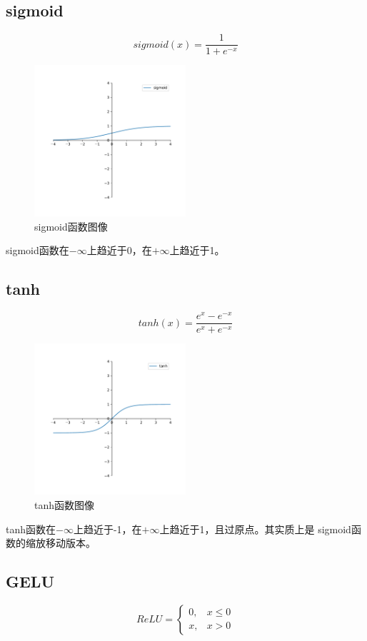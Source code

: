 \documentclass[AutoFakeBold]{LZUThesis}
\begin{document}
\subsection{sigmoid}
$$sigmoid(x)=\frac{1}{1+e^{-x}}$$
\begin{figure}[H]
	\centering
    \includegraphics[width=0.5\textwidth]{figures/sigmoid.pdf}
    \caption{sigmoid函数图像}
    \label{fig_sigmoid}
\end{figure}
sigmoid函数在$-\infty$上趋近于0，在$+\infty$上趋近于1。

\subsection{tanh}
$$tanh(x) = \frac{e^x-e^{-x}}{e^x+e^{-x}}$$
\begin{figure}[H]
	\centering
    \includegraphics[width=0.5\textwidth]{figures/tanh.pdf}
    \caption{tanh函数图像}
    \label{fig_tanh}
\end{figure}
tanh函数在$-\infty$上趋近于-1，在$+\infty$上趋近于1，且过原点。其实质上是
sigmoid函数的缩放移动版本。

\subsection{GELU}
$$
ReLU=
\left\{\begin{matrix}
    0, & x \leq 0 \\
    x, & x > 0
\end{matrix}\right.
$$
\end{document}
